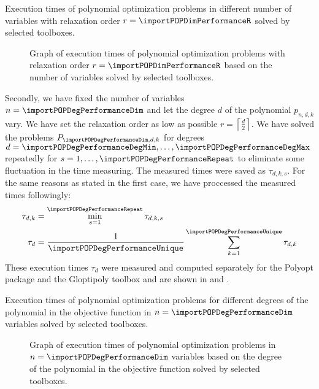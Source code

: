 \begin{table}[ht]
  \centering
  
  \caption{Execution times of polynomial optimization problems in different number of variables with relaxation order $r = \importPOPDimPerformanceR$ solved by selected toolboxes.}
\end{table}

\begin{figure}[ht]
  \centering
  \resizebox{0.95\textwidth}{!}{}
  \caption{Graph of execution times of polynomial optimization problems with relaxation order $r = \importPOPDimPerformanceR$ based on the number of variables solved by selected toolboxes.}
\end{figure}

Secondly, we have fixed the number of variables $n = \importPOPDegPerformanceDim$ and let the degree $d$ of the polynomial $p_{n,d,k}$ vary.
We have set the relaxation order as low as possible $r = \left\lceil\frac{d}{2}\right\rceil$.
We have solved the problems $P_{\importPOPDegPerformanceDim,d,k}$ for degrees $d = \importPOPDegPerformanceDegMin, \ldots, \importPOPDegPerformanceDegMax$ repeatedly for $s = 1,\ldots, \importPOPDegPerformanceRepeat$ to eliminate some fluctuation in the time measuring.
The measured times were saved as $\tau_{d,k,s}$.
For the same reasons as stated in the first case, we have proccessed the measured times followingly:
\begin{align}
  \tau_{d,k} &= \min_{s=1}^{\importPOPDegPerformanceRepeat} \tau_{d,k,s}\\
  \tau_d &= \frac{1}{\importPOPDegPerformanceUnique}\sum_{k=1}^{\importPOPDegPerformanceUnique} \tau_{d,k}
\end{align}
These execution times $\tau_d$ were measured and computed separately for the Polyopt package and the Gloptipoly toolbox and are shown in  and .

\begin{table}[ht]
  \centering
  
  \caption{Execution times of polynomial optimization problems for different degrees of the polynomial in the objective function in $n = \importPOPDegPerformanceDim$ variables solved by selected toolboxes.}
\end{table}

\begin{figure}[ht]
  \centering
  \resizebox{0.95\textwidth}{!}{}
  \caption{Graph of execution times of polynomial optimization problems in $n = \importPOPDegPerformanceDim$ variables based on the degree of the polynomial in the objective function solved by selected toolboxes.}
\end{figure}

